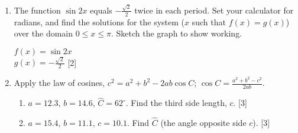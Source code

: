 \documentclass[12pt, twoside]{article}
\begin{document}
\begin{enumerate}
  \newpage
    \item The function $\sin 2x$ equals $-\frac{\sqrt{2}}{2}$ twice in each period. Set your calculator for radians, and find the solutions for the system ($x$ such that $f(x)=g(x)$) over the domain $0 \leq x \leq \pi$. Sketch the graph to show working.
    \begin{multicols}{2}
        \qquad $f(x)=\sin 2x$ \\[0.25cm] $\displaystyle g(x)=-\frac{\sqrt{2}}{2}$ \hfill [2] \vspace{0.3cm}
    \end{multicols}

\item Apply the law of cosines, $c^2=a^2+b^2-2ab \cos C$; $\displaystyle \cos C= \frac{a^2+b^2-c^2}{2ab}$.
    \begin{enumerate}
        \item $a=12.3$, $b=14.6$, $\hat{C} = 62^\circ$. Find the third side length, $c$. \hfill [3]
        \item $a=15.4$, $b=11.1$, $c=10.1$. Find $\hat{C}$ (the angle opposite side $c$). \hfill [3]
    \end{enumerate}


\end{enumerate}
\end{document}
